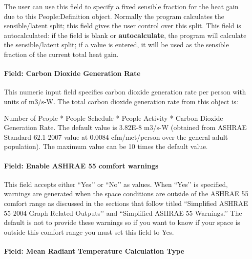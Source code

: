The user can use this field to specify a fixed sensible fraction for the heat gain due to this People:Definition object. Normally the program calculates the sensible/latent split; this field gives the user control over this split. This field is autocalculated: if the field is blank or \textbf{autocalculate}, the program will calculate the sensible/latent split; if a value is entered, it will be used as the sensible fraction of the current total heat gain.

\paragraph{Field: Carbon Dioxide Generation Rate}\label{field-carbon-dioxide-generation-rate-people-definition}

This numeric input field specifies carbon dioxide generation rate per person with units of m3/s-W. The total carbon dioxide generation rate from this object is:

Number of People * People Schedule * People Activity * Carbon Dioxide Generation Rate. The default value is 3.82E-8 m3/s-W (obtained from ASHRAE Standard 62.1-2007 value at 0.0084 cfm/met/person over the general adult population). The maximum value can be 10 times the default value.

\paragraph{Field: Enable ASHRAE 55 comfort warnings}\label{field-enable-ashrae-55-comfort-warnings-people-definition}

This field accepts either ``Yes’’ or ``No’’ as values. When ``Yes’’ is specified, warnings are generated when the space conditions are outside of the ASHRAE 55 comfort range as discussed in the sections that follow titled ``Simplified ASHRAE 55-2004 Graph Related Outputs’’ and ``Simplified ASHRAE 55 Warnings.’’ The default is not to provide these warnings so if you want to know if your space is outside this comfort range you must set this field to Yes.

\paragraph{Field: Mean Radiant Temperature Calculation Type}\label{field-mean-radiant-temperature-calculation-type-people-definition}

